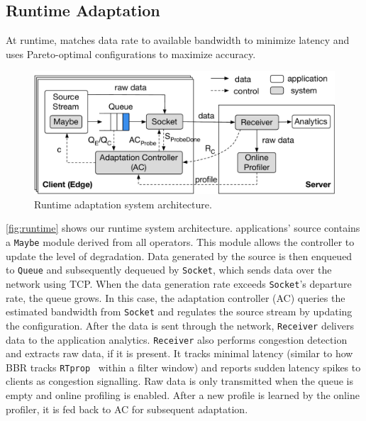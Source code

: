 \subsection{Runtime Adaptation}
\label{sec:runtime}

At runtime, \sysname{} matches data rate to available bandwidth to minimize
latency and uses Pareto-optimal configurations to maximize accuracy.

\begin{figure}
  \centering
  \includegraphics[width=\linewidth]{figures/runtime-adaptation.pdf}
  \caption{Runtime adaptation system architecture.}
  \label{fig:runtime}
  \vspace{-1em}
\end{figure}

\autoref{fig:runtime} shows our runtime system architecture. \sysname{}
applications' source contains a \texttt{Maybe} module derived from all \maybe{}
operators. This module allows the controller to update the level of
degradation. Data generated by the source is then enqueued to \texttt{Queue} and
subsequently dequeued by \texttt{Socket}, which sends data over the network
using TCP. When the data generation rate exceeds \texttt{Socket}'s departure
rate, the queue grows. In this case, the adaptation controller (AC) queries the
estimated bandwidth from \texttt{Socket} and regulates the source stream by
updating the configuration. After the data is sent through the network,
\texttt{Receiver} delivers data to the application analytics. \texttt{Receiver}
also performs congestion detection and extracts raw data, if it is present.  It
tracks minimal latency (similar to how BBR tracks
\texttt{RTprop}~\cite{cardwell2017bbr} within a filter window) and reports
sudden latency spikes to clients as congestion signalling. Raw data is only
transmitted when the queue is empty and online profiling is enabled. After a new
profile is learned by the online profiler, it is fed back to AC for subsequent
adaptation.

